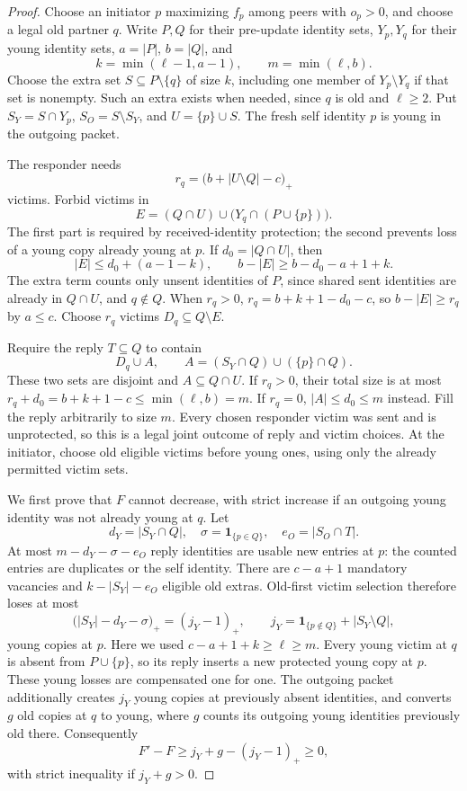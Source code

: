 \documentclass[11pt]{article}
\begin{document}
\begin{proof}
Choose an initiator $p$ maximizing $f_p$ among peers with
$o_p>0$, and choose a legal old partner $q$.
Write $P,Q$ for their pre-update identity sets, $Y_p,Y_q$
for their young identity sets, $a=|P|$, $b=|Q|$, and
\[
 k=\min(\ell-1,a-1),\qquad m=\min(\ell,b).
\]
Choose the extra set $S\subseteq P\setminus\{q\}$ of size
$k$, including one member of $Y_p\setminus Y_q$ if that set
is nonempty. Such an extra exists when needed, since $q$
is old and $\ell\ge2$. Put $S_Y=S\cap Y_p$,
$S_O=S\setminus S_Y$, and $U=\{p\}\cup S$.
The fresh self identity $p$ is young in the outgoing packet.

The responder needs
\[
 r_q=\bigl(b+|U\setminus Q|-c\bigr)_+
\]
victims. Forbid victims in
\[
 E=(Q\cap U)\cup\bigl(Y_q\cap(P\cup\{p\})\bigr).
\]
The first part is required by received-identity protection;
the second prevents loss of a young copy already young at $p$.
If $d_0=|Q\cap U|$, then
\[
 |E|\le d_0+(a-1-k),\qquad
 b-|E|\ge b-d_0-a+1+k.
\]
The extra term counts only unsent identities of $P$, since
shared sent identities are already in $Q\cap U$, and
$q\notin Q$. When $r_q>0$,
$r_q=b+k+1-d_0-c$, so $b-|E|\ge r_q$ by $a\le c$.
Choose $r_q$ victims $D_q\subseteq Q\setminus E$.

Require the reply $T\subseteq Q$ to contain
\[
 D_q\cup A,\qquad
 A=(S_Y\cap Q)\cup(\{p\}\cap Q).
\]
These two sets are disjoint and $A\subseteq Q\cap U$.
If $r_q>0$, their total size is at most
$r_q+d_0=b+k+1-c\le\min(\ell,b)=m$.
If $r_q=0$, $|A|\le d_0\le m$ instead.
Fill the reply arbitrarily to size $m$.
Every chosen responder victim was sent and is unprotected,
so this is a legal joint outcome of reply and victim choices.
At the initiator, choose old eligible victims before young
ones, using only the already permitted victim sets.

We first prove that $F$ cannot decrease, with strict increase
if an outgoing young identity was not already young at $q$.
Let
\[
 d_Y=|S_Y\cap Q|,\quad \sigma=\mathbf1_{\{p\in Q\}},\quad
 e_O=|S_O\cap T|.
\]
At most $m-d_Y-\sigma-e_O$ reply identities are usable
new entries at $p$: the counted entries are duplicates or
the self identity. There are $c-a+1$ mandatory vacancies
and $k-|S_Y|-e_O$ eligible old extras. Old-first victim
selection therefore loses at most
\[
 \bigl(|S_Y|-d_Y-\sigma\bigr)_+=(j_Y-1)_+,
 \qquad
 j_Y=\mathbf1_{\{p\notin Q\}}+|S_Y\setminus Q|,
\]
young copies at $p$. Here we used
$c-a+1+k\ge\ell\ge m$.
Every young victim at $q$ is absent from $P\cup\{p\}$,
so its reply inserts a new protected young copy at $p$.
These young losses are compensated one for one.
The outgoing packet additionally creates $j_Y$ young copies
at previously absent identities, and converts $g$ old copies
at $q$ to young, where $g$ counts its outgoing young
identities previously old there. Consequently
\[
 F'-F\ge j_Y+g-(j_Y-1)_+\ge0,
\]
with strict inequality if $j_Y+g>0$.


\end{proof}
\end{document}
